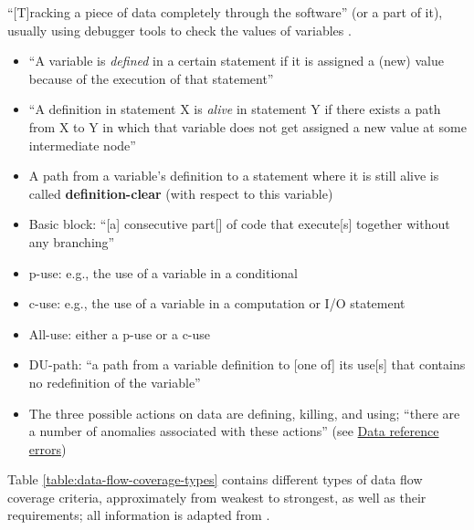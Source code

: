 ``[T]racking a piece of data completely through the software'' (or a part of
it), usually using debugger tools to check the values of variables
\cite[p.~114]{patton_software_2006}.

\begin{itemize}
      \item ``A variable is \emph{defined} in a certain statement if it is
            assigned a (new) value because of the execution of that
            statement'' \cite[p.~424]{van_vliet_software_2000}
      \item ``A definition in statement X is \emph{alive} in statement Y if
            there exists a path from X to Y in which that variable does not
            get assigned a new value at some intermediate node''
            \cite[p.~424]{van_vliet_software_2000}
      \item A path from a variable's definition to a statement where it is
            still alive is called \textbf{definition-clear} (with respect to
            this variable) \cite[p.~424]{van_vliet_software_2000}
      \item Basic block: ``[a] consecutive part[] of code that execute[s]
            together without any branching'' \cite[p.~477]{peters_software_2000}
      \item \acf{p-use}: e.g., the use of a variable in a conditional
            \cite[p.~424]{van_vliet_software_2000}
      \item \acf{c-use}: e.g., the use of a variable in a computation or I/O
            statement \cite[p.~424]{van_vliet_software_2000}
      \item All-use: either a \acs{p-use} or a \acs{c-use}~
            \cite[p.~478]{peters_software_2000}
      \item DU-path: ``a path from a variable definition to [one of] its use[s]
            that contains no redefinition of the variable''
            \cite[pp.~478-479]{peters_software_2000}
      \item The three possible actions on data are defining, killing, and using;
            ``there are a number of anomalies associated with these actions''
            \cite[pp.~478,480]{peters_software_2000}
            (see \hyperref[data-ref-errors]{Data reference errors})
\end{itemize}

Table \ref{table:data-flow-coverage-types} contains different types of data
flow coverage criteria, approximately from weakest to strongest, as well as
their requirements; all information is adapted from
\cite[pp.~424-425]{van_vliet_software_2000} .

